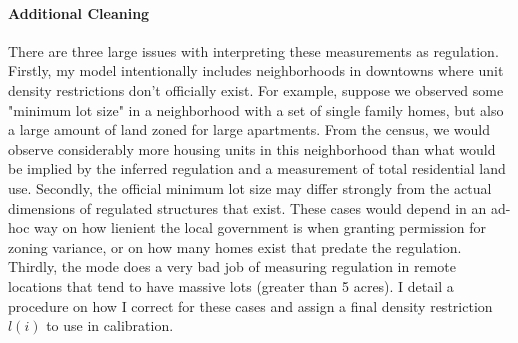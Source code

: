\documentclass[]{article}
\begin{document}
\paragraph*{Additional Cleaning}
There are three large issues with interpreting these measurements as regulation. Firstly, my model intentionally includes neighborhoods in downtowns where unit density restrictions don't officially exist. For example, suppose we observed some "minimum lot size" in a neighborhood with a set of single family homes, but also a large amount of land zoned for large apartments. From the census, we would observe considerably more housing units in this neighborhood than what would be implied by the inferred regulation and a measurement of total residential land use. Secondly, the official minimum lot size may differ strongly from the actual dimensions of regulated structures that exist. These cases would depend in an ad-hoc way on how lienient the local government is when granting permission for zoning variance, or on how many homes exist that predate the regulation. Thirdly, the mode does a very bad job of measuring regulation in remote locations that tend to have massive lots (greater than 5 acres). I detail a procedure on how I correct for these cases and assign a final density restriction $l(i)$ to use in calibration.
\end{document}
